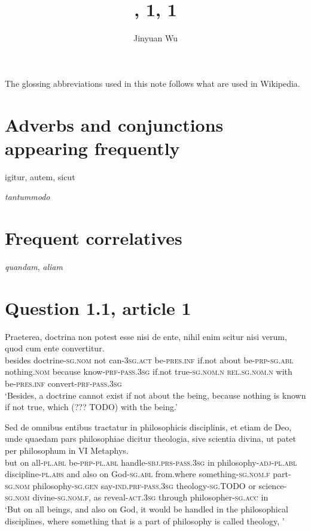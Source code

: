 \documentclass[a4paper, 12pt]{article}
\title{\form{Summa}, 1, 1}
\author{Jinyuan Wu}
\newcommand{\form}[1]{\emph{#1}}
\newcommand*{\category}[1]{\textsc{#1}}
\newcommand{\translate}[1]{`#1'}
\begin{document}
\maketitle

The glossing abbreviations used in this note 
follows what are used in Wikipedia.

\section{Adverbs and conjunctions appearing frequently}

igitur, autem, sicut

\form{tantummodo}

\section{Frequent correlatives}

\form{quandam}, \form{aliam}

\section{Question 1.1, article 1}

\begin{exe}
    \ex \gll Praeterea, doctrina non potest esse nisi de ente, 
    nihil enim scitur nisi verum, 
    quod cum ente convertitur. \\
    besides doctrine-\category{sg.nom} not can-\category{3sg.act} be-\category{pres.inf}
    if.not about be-\category{prp}-\category{sg.abl}
    nothing.\category{nom} because know-\category{prf}-\category{pass.3sg}
    if.not true-\category{sg.nom.n} 
    \category{rel}.\category{sg.nom.n} with be-\category{pres.inf} convert-\category{prf}-\category{pass.3sg} \\
    \translate{Besides, a doctrine cannot exist if not about the being, 
    because nothing is known if not true, 
    which (??? TODO) with the being.}
    
    \ex \gll Sed de omnibus entibus 
    tractatur in philosophicis disciplinis, 
    et etiam de Deo, 
    unde quaedam pars philosophiae dicitur theologia, 
    sive scientia divina, 
    ut patet per philosophum in VI Metaphys. \\
    but on all-\category{pl.abl} be-\category{prp}-\category{pl.abl}  
    handle-\category{sbj.prs}-\category{pass.3sg} in philosophy-\category{adj}-\category{pl.abl} discipline-\category{pl.abs} 
    and also on God-\category{sg.abl}
    from.where something-\category{sg.nom.f} part-\category{sg.nom} philosophy-\category{sg.gen} say-\category{ind.prf}-\category{pass.3sg} theology-\category{sg.TODO} 
    or science-\category{sg.nom} divine-\category{sg.nom.f},
    as reveal-\category{act.3sg} through philosopher-\category{sg.acc} in  \\
    \glt \translate{But on all beings, and also on God, 
    it would be handled in the philosophical disciplines, 
    where something that is a part of philosophy is called theology,
    }
\end{exe}
\end{document}
